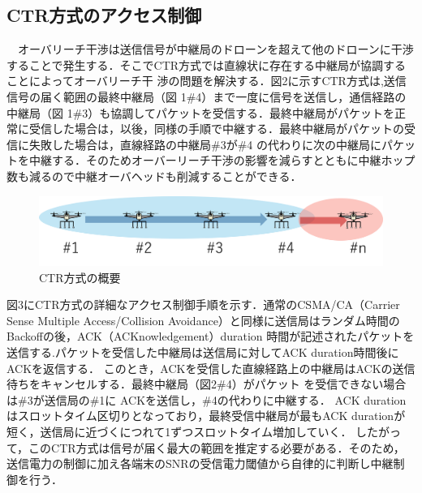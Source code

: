 \documentclass[a4paper,10pt]{ltjsarticle}
\begin{document}
\subsection{CTR方式のアクセス制御}
　オーバリーチ干渉は送信信号が中継局のドローンを超えて他のドローンに干渉することで発生する．そこでCTR方式では直線状に存在する中継局が協調することによってオーバリーチ干
渉の問題を解決する．図2に示すCTR方式は,送信信号の届く範囲の最終中継局（図 1\#4）まで一度に信号を送信し，通信経路の中継局（図 1\#3）も協調してパケットを受信する．最終中継局がパケットを正常に受信した場合は，以後，同様の手順で中継する．最終中継局がパケットの受信に失敗した場合は，直線経路の中継局\#3が\#4 の代わりに次の中継局にパケットを中継する．そのためオーバーリーチ干渉の影響を減らすとともに中継ホップ数も減るので中継オーバヘッドも削減することができる．
\begin{figure}[H]
  \centering
  \includegraphics[width=\linewidth]{ctr_topology.png} %
  \caption{CTR方式の概要}
  \label{fig:CTR方式のトポロジー} %
\end{figure}
図3にCTR方式の詳細なアクセス制御手順を示す．通常のCSMA/CA（Carrier Sense Multiple Access/Collision Avoidance）と同様に送信局はランダム時間のBackoffの後，ACK（ACKnowledgement）duration
時間が記述されたパケットを送信する.パケットを受信した中継局は送信局に対してACK duration時間後にACKを返信する．
このとき，ACKを受信した直線経路上の中継局はACKの送信待ちをキャンセルする．最終中継局（図2\#4）がパケット を受信できない場合は\#3が送信局の\#1に ACKを送信し，\#4の代わりに中継する．
ACK duration はスロットタイム区切りとなっており，最終受信中継局が最もACK durationが短く，送信局に近づくにつれて1ずつスロットタイム増加していく．
したがって，このCTR方式は信号が届く最大の範囲を推定する必要がある．そのため，送信電力の制御に加え各端末のSNRの受信電力閾値から自律的に判断し中継制御を行う．
\end{document}
